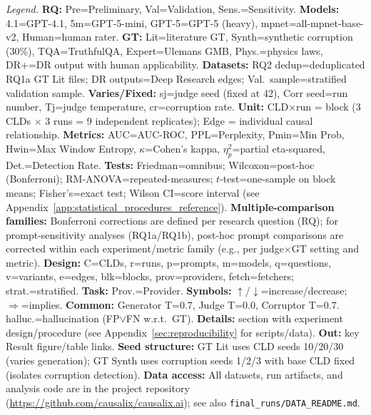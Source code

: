 \begin{landscape}
\begin{table}[H]
\vspace{0.3em}
\begin{minipage}{\linewidth}
\scriptsize
\textit{Legend.} 
\textbf{RQ:} Pre=Preliminary, Val=Validation, Sens.=Sensitivity.
\textbf{Models:} 4.1=GPT-4.1, 5m=GPT-5-mini, GPT-5=GPT-5 (heavy), mpnet=all-mpnet-base-v2, Human=human rater.
\textbf{GT:} Lit=literature GT, Synth=synthetic corruption (30\%), TQA=TruthfulQA, Expert=Ulemans GMB, Phys.=physics laws, DR+=DR output with human applicability.
\textbf{Datasets:} RQ2 dedup=deduplicated RQ1a GT Lit files; DR outputs=Deep Research edges; Val.\ sample=stratified validation sample.
\textbf{Varies/Fixed:} sj=judge seed (fixed at 42), Corr seed=run number, Tj=judge temperature, cr=corruption rate.
\textbf{Unit:} CLD$\times$run = block (3 CLDs $\times$ 3 runs = 9 independent replicates); Edge = individual causal relationship.
\textbf{Metrics:} AUC=AUC-ROC, PPL=Perplexity, Pmin=Min Prob, Hwin=Max Window Entropy, $\kappa$=Cohen's kappa, $\eta^2_p$=partial eta-squared, Det.=Detection Rate.
\textbf{Tests:} Friedman=omnibus; Wilcoxon=post-hoc (Bonferroni); RM-ANOVA=repeated-measures; $t$-test=one-sample on block means; Fisher's=exact test; Wilson CI=score interval (see Appendix~\ref{app:statistical_procedures_reference}).
\textbf{Multiple-comparison families:} Bonferroni corrections are defined per research question (RQ); for prompt-sensitivity analyses (RQ1a/RQ1b), post-hoc prompt comparisons are corrected within each experiment/metric family (e.g., per judge$\times$GT setting and metric).
\textbf{Design:} C=CLDs, r=runs, p=prompts, m=models, q=questions, v=variants, e=edges, blk=blocks, prov=providers, fetch=fetchers; strat.=stratified. \textbf{Task:} Prov.=Provider. \textbf{Symbols:} $\uparrow$/$\downarrow$=increase/decrease; $\Rightarrow$=implies.
\textbf{Common:} Generator T=0.7, Judge T=0.0, Corruptor T=0.7. halluc.=hallucination (FP$\lor$FN w.r.t.\ GT).
\textbf{Details:} section with experiment design/procedure (see Appendix~\ref{sec:reproducibility} for scripts/data). \textbf{Out:} key Result figure/table links.
\textbf{Seed structure:} GT Lit uses CLD seeds 10/20/30 (varies generation); GT Synth uses corruption seeds 1/2/3 with base CLD fixed (isolates corruption detection).
\textbf{Data access:} All datasets, run artifacts, and analysis code are in the project repository (\url{https://github.com/causalix/causalix.ai}); see also \texttt{final\_runs/DATA\_README.md}.
\end{minipage}
\end{table}
\end{landscape}

